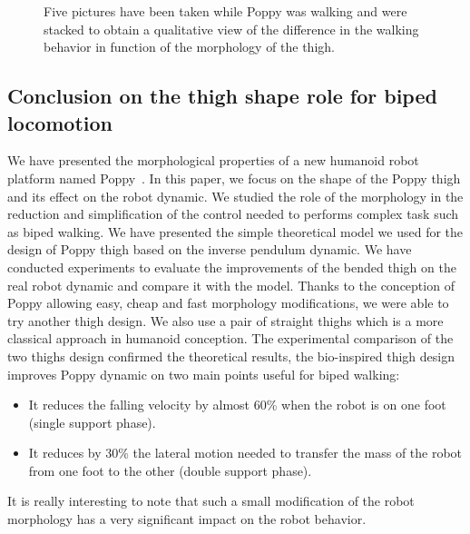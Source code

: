 \begin{figure}[h]
\centering
    \hfil
    \caption{Five pictures have been taken while Poppy was walking and were stacked to obtain a qualitative view of the difference in the walking behavior in function of the morphology of the thigh.}
    \label{fig:poppy_walking_compared}
\end{figure}


\subsection{Conclusion on the thigh shape role for biped locomotion} %
We have presented the morphological properties of a new humanoid robot platform named Poppy~\cite{lapeyre2013poppy}. In this paper, we focus on the shape of the Poppy thigh and its effect on the robot dynamic. We studied the role of the morphology in the reduction and simplification of the control needed to performs complex task such as biped walking. We have presented the simple theoretical model we used for the design of Poppy thigh based on the inverse pendulum dynamic. We have conducted experiments to evaluate the improvements of the bended thigh on the real robot dynamic and compare it with the model. Thanks to the conception of Poppy allowing easy, cheap and fast morphology modifications, we were able to try another thigh design. We also use a pair of straight thighs which is a more classical approach in humanoid conception. The experimental comparison of the two thighs design confirmed the theoretical results, the bio-inspired thigh design improves Poppy dynamic on two main points useful for biped walking:
\begin{itemize}
    \item It reduces the falling velocity by almost 60\% when the robot is on one foot (single support phase).
    \item It reduces by 30\% the lateral motion needed to transfer the mass of the robot from one foot to the other (double support phase).
\end{itemize}
It is really interesting to note that such a small modification of the robot morphology has a very significant impact on the robot behavior.

